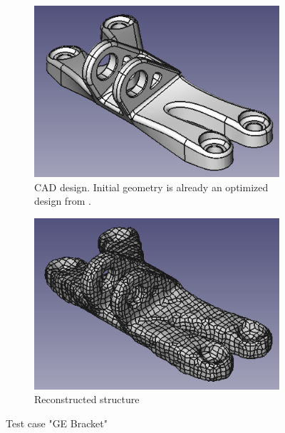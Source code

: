 \begin{figure}[H]
\begin{subfigure}[t]{.45\textwidth}
\begin{center}
\includegraphics[width=.9\textwidth]{Pictures/Results/BracketIn.png}
\end{center}
\caption{CAD design. Initial geometry is already an optimized design from \cite{GEBracketTripon}.}
\label{fig:GEbracketCAD}
\end{subfigure}
\begin{subfigure}[t]{.45\textwidth}
\begin{center}
\includegraphics[width=.9\textwidth]{Pictures/Results/BracketOut.png}
\end{center}
\caption{Reconstructed structure}
\label{fig:GEbracketOPTIM}
\end{subfigure}
\caption{Test case "GE Bracket"}
\end{figure}

